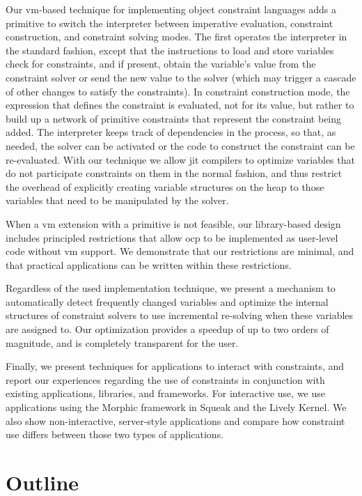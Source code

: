 Our \ac{vm}-based technique for implementing object constraint
languages adds a primitive to switch the interpreter between
imperative evaluation, constraint construction, and constraint solving
modes. The first operates the interpreter in the standard fashion,
except that the instructions to load and store variables check for
constraints, and if present, obtain the variable's value from the
constraint solver or send the new value to the solver (which may
trigger a cascade of other changes to satisfy the constraints).  In
constraint construction mode, the expression that defines the
constraint is evaluated, not for its value, but rather to build up a
network of primitive constraints that represent the constraint being
added.  The interpreter keeps track of dependencies in the process, so
that, as needed, the solver can be activated or the code to construct
the constraint can be re-evaluated. With our technique we allow
\ac{jit} compilers to optimize variables that do not participate
constraints on them in the normal fashion, and thus restrict the
overhead of explicitly creating variable structures on the heap to
those variables that need to be manipulated by the solver.

When a \ac{vm} extension with a primitive is not feasible, our
library-based design includes principled restrictions that allow
\ac{ocp} to be implemented as user-level code without \ac{vm}
support. We demonstrate that our restrictions are minimal, and that
practical applications can be written within these restrictions.

Regardless of the used implementation technique, we present a mechanism to
automatically detect frequently changed variables and optimize the internal
structures of constraint solvers to use incremental re-solving when these
variables are assigned to. Our optimization provides a speedup of up to two
orders of magnitude, and is completely transparent for the user.

Finally, we present techniques for applications to interact with
constraints, and report our experiences regarding the use of
constraints in conjunction with existing applications, libraries, and
frameworks. For interactive use, we use applications using the Morphic
framework in Squeak and the Lively Kernel. We also show
non-interactive, server-style applications and compare how constraint
use differs between those two types of applications.

\section{Outline}
\label{sec:outline}

